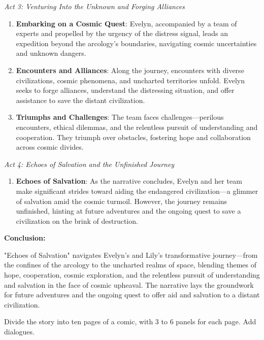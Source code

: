 \begin{aquote}
    \noindent\emph{Act 3: Venturing Into the Unknown and Forging Alliances}
    \begin{enumerate}
        \item \textbf{Embarking on a Cosmic Quest}: Evelyn, accompanied by a team of experts and propelled by the urgency of the distress signal, leads an expedition beyond the arcology's boundaries, navigating cosmic uncertainties and unknown dangers.
        \item \textbf{Encounters and Alliances}: Along the journey, encounters with diverse civilizations, cosmic phenomena, and uncharted territories unfold. Evelyn seeks to forge alliances, understand the distressing situation, and offer assistance to save the distant civilization.
        \item \textbf{Triumphs and Challenges}: The team faces challenges—perilous encounters, ethical dilemmas, and the relentless pursuit of understanding and cooperation. They triumph over obstacles, fostering hope and collaboration across cosmic divides.
    \end{enumerate}

    \noindent\emph{Act 4: Echoes of Salvation and the Unfinished Journey}
    \begin{enumerate}
        \item \textbf{Echoes of Salvation}: As the narrative concludes, Evelyn and her team make significant strides toward aiding the endangered civilization—a glimmer of salvation amid the cosmic turmoil. However, the journey remains unfinished, hinting at future adventures and the ongoing quest to save a civilization on the brink of destruction.
    \end{enumerate}

    \noindent\textbf{Conclusion:}\smallskip

    "Echoes of Salvation" navigates Evelyn's and Lily's transformative journey—from the confines of the arcology to the uncharted realms of space, blending themes of hope, cooperation, cosmic exploration, and the relentless pursuit of understanding and salvation in the face of cosmic upheaval. The narrative lays the groundwork for future adventures and the ongoing quest to offer aid and salvation to a distant civilization.
\end{aquote}

\begin{qquote}
    Divide the story into ten pages of a comic, with 3 to 6 panels for each page. Add dialogues.
\end{qquote}

